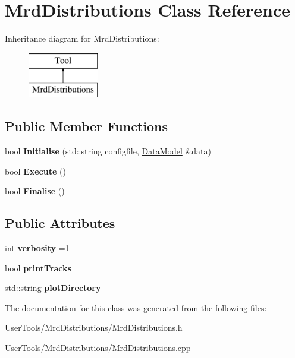 \hypertarget{classMrdDistributions}{\section{Mrd\-Distributions Class Reference}
\label{classMrdDistributions}
}
Inheritance diagram for Mrd\-Distributions\-:\begin{figure}[H]
\begin{center}
\leavevmode
\includegraphics[height=2.000000cm]{classMrdDistributions}
\end{center}
\end{figure}
\subsection*{Public Member Functions}
\begin{DoxyCompactItemize}
\item 
\hypertarget{classMrdDistributions_a0e32e324d6f93d4a45b6b313fc1fb735}{bool {\bfseries Initialise} (std\-::string configfile, \hyperlink{classDataModel}{Data\-Model} \&data)}\label{classMrdDistributions_a0e32e324d6f93d4a45b6b313fc1fb735}

\item 
\hypertarget{classMrdDistributions_a9d925095cb7ff1ede865837076da0b03}{bool {\bfseries Execute} ()}\label{classMrdDistributions_a9d925095cb7ff1ede865837076da0b03}

\item 
\hypertarget{classMrdDistributions_acb7753d5c69220fabc7f93c9bd6f3948}{bool {\bfseries Finalise} ()}\label{classMrdDistributions_acb7753d5c69220fabc7f93c9bd6f3948}

\end{DoxyCompactItemize}
\subsection*{Public Attributes}
\begin{DoxyCompactItemize}
\item 
\hypertarget{classMrdDistributions_a47f2a560f640c946ed721acdf093ab95}{int {\bfseries verbosity} =1}\label{classMrdDistributions_a47f2a560f640c946ed721acdf093ab95}

\item 
\hypertarget{classMrdDistributions_acfa5709e73f4984f9bd4664d11e6ff39}{bool {\bfseries print\-Tracks}}\label{classMrdDistributions_acfa5709e73f4984f9bd4664d11e6ff39}

\item 
\hypertarget{classMrdDistributions_a5b40d02e337e41a40f52f78624bca5d5}{std\-::string {\bfseries plot\-Directory}}\label{classMrdDistributions_a5b40d02e337e41a40f52f78624bca5d5}

\end{DoxyCompactItemize}


The documentation for this class was generated from the following files\-:\begin{DoxyCompactItemize}
\item 
User\-Tools/\-Mrd\-Distributions/Mrd\-Distributions.\-h\item 
User\-Tools/\-Mrd\-Distributions/Mrd\-Distributions.\-cpp\end{DoxyCompactItemize}
